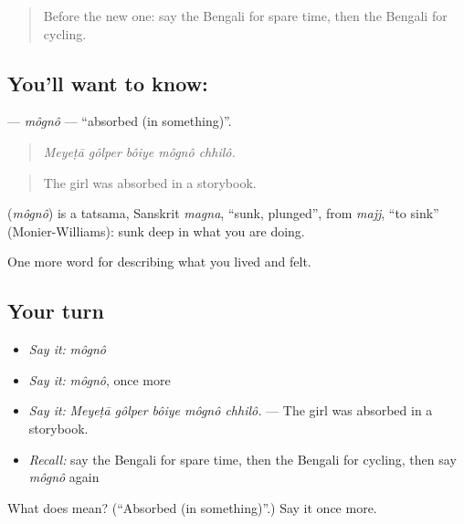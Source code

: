 \begin{quote}
Before the new one: say the Bengali for spare time, then the Bengali for cycling.
\end{quote}

\subsection*{You'll want to know: }
\textbf{} — \emph{môgnô} — \textquotedblleft{}absorbed (in something)\textquotedblright{}.

\begin{quote}
    
\end{quote}

\begin{quote}
\emph{Meyeṭā gôlper bôiye môgnô chhilô.}
\end{quote}

\begin{quote}
The girl was absorbed in a storybook.
\end{quote}

\begin{cousinweb}
\textbf{} (\emph{môgnô}) is a tatsama, Sanskrit \emph{magna}, \textquotedblleft{}sunk, plunged\textquotedblright{}, from \emph{majj}, \textquotedblleft{}to sink\textquotedblright{} (Monier-Williams): sunk deep in what you are doing.
\end{cousinweb}

\begin{grammarlens}[title={What you've built}]
One more word for describing what you lived and felt.
\end{grammarlens}

\subsection*{Your turn}
\begin{itemize}
\raggedright
  \item \emph{Say it:} \emph{môgnô}
  \item \emph{Say it:} \emph{môgnô}, once more
  \item \emph{Say it:} \emph{Meyeṭā gôlper bôiye môgnô chhilô.} — The girl was absorbed in a storybook.
  \item \emph{Recall:} say the Bengali for spare time, then the Bengali for cycling, then say \emph{môgnô} again
\end{itemize}

\begin{tcolorbox}[breakable,colback=teal!4,colframe=teal!35!black,title={Before you move on}]
What does  mean? (\textquotedblleft{}Absorbed (in something)\textquotedblright{}.) Say it once more.
\end{tcolorbox}
